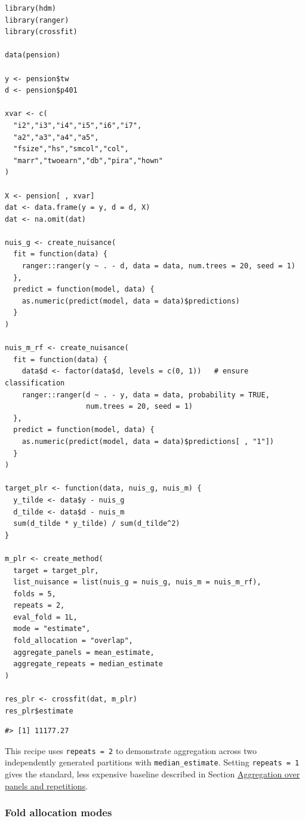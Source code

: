 \begin{verbatim}
library(hdm)
library(ranger)
library(crossfit)

data(pension)

y <- pension$tw
d <- pension$p401

xvar <- c(
  "i2","i3","i4","i5","i6","i7",
  "a2","a3","a4","a5",
  "fsize","hs","smcol","col",
  "marr","twoearn","db","pira","hown"
)

X <- pension[ , xvar]
dat <- data.frame(y = y, d = d, X)
dat <- na.omit(dat)

nuis_g <- create_nuisance(
  fit = function(data) {
    ranger::ranger(y ~ . - d, data = data, num.trees = 20, seed = 1)
  },
  predict = function(model, data) {
    as.numeric(predict(model, data = data)$predictions)
  }
)

nuis_m_rf <- create_nuisance(
  fit = function(data) {
    data$d <- factor(data$d, levels = c(0, 1))   # ensure classification
    ranger::ranger(d ~ . - y, data = data, probability = TRUE,
                   num.trees = 20, seed = 1)
  },
  predict = function(model, data) {
    as.numeric(predict(model, data = data)$predictions[ , "1"])
  }
)

target_plr <- function(data, nuis_g, nuis_m) {
  y_tilde <- data$y - nuis_g
  d_tilde <- data$d - nuis_m
  sum(d_tilde * y_tilde) / sum(d_tilde^2)
}

m_plr <- create_method(
  target = target_plr,
  list_nuisance = list(nuis_g = nuis_g, nuis_m = nuis_m_rf),
  folds = 5,
  repeats = 2,
  eval_fold = 1L,
  mode = "estimate",
  fold_allocation = "overlap",
  aggregate_panels = mean_estimate,
  aggregate_repeats = median_estimate
)

res_plr <- crossfit(dat, m_plr)
res_plr$estimate
\end{verbatim}

\begin{verbatim}
#> [1] 11177.27
\end{verbatim}

This recipe uses \texttt{repeats\ =\ 2} to demonstrate aggregation across two independently generated partitions with \texttt{median\_estimate}. Setting \texttt{repeats\ =\ 1} gives the standard, less expensive baseline described in Section \hyperref[subsec:aggregation]{Aggregation over panels and repetitions}.

\subsubsection{Fold allocation modes}\label{fold-allocation-modes}

